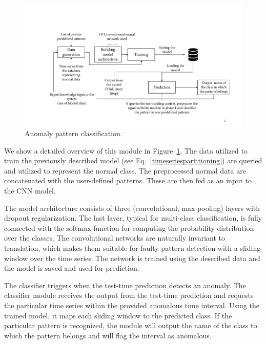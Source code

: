 \begin{figure}[htbp]
\centerline{\includegraphics[width=1.0\textwidth]{gfx/chap4/patternclassification.pdf}}
\caption{Anomaly pattern classification.}
\label{fig:patternclassification}
\end{figure}

We show a detailed overview of this module in Figure~\ref{fig:patternclassification}. The data utilized to train the previously described model (see Eq.~\ref{timeseriespartitioning}) are queried and utilized to represent the normal class. The preprocessed normal data are concatenated with the user-defined patterns. These are then fed as an input to the CNN model. 

The model architecture consists of three (convolutional, max-pooling) layers with dropout regularization. The last layer, typical for multi-class classification, is fully connected with the softmax function for computing the probability distribution over the classes. The convolutional networks are naturally invariant to translation, which makes them suitable for faulty pattern detection with a sliding window over the time series. The network is trained using the described data and the model is saved and used for prediction. 

The classifier triggers when the test-time prediction detects an anomaly. The classifier module receives the output from the test-time prediction and requests the particular time series within the provided anomalous time interval. Using the trained model, it maps each sliding window to the predicted class. If the particular pattern is recognized, the module will output the name of the class to which the pattern belongs and will flag the interval as anomalous.

